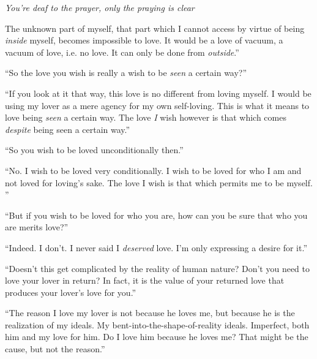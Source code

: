 \documentclass{article}
\begin{document}
\textit{You're deaf to the prayer, only the praying is clear}
\newline\newline

The unknown part of myself, that part which I cannot access by virtue of
being \textit{inside} myself, becomes impossible to love. It would be
a love of vacuum, a vacuum of love, i.e. no love. It can
only be done from \textit{outside}.'' \newline
\newline

``So the love you wish is really a wish to be \textit{seen} a certain
way?'' \newline
\newline

``If you look at it that way, this love is no different from loving
myself. I would be using my lover as a mere agency for my own
self-loving. This is what it means to love being \textit{seen} a certain
way. The love \textit{I} wish however is that which comes
\textit{despite} being seen a certain way.'' \newline
\newline

``So you wish to be loved unconditionally then.'' \newline
\newline

``No. I wish to be loved very conditionally. I wish to be loved for who
I am and not loved for loving's sake. The love I wish is that which
permits me to be myself. ''\newline
\newline

``But if you wish to be loved for who you are, how can you be sure that
who you are merits love?'' \newline
\newline

``Indeed. I don't. I never said I \textit{deserved} love. I'm only
expressing a desire for it.''\newline
\newline

``Doesn't this get complicated by the reality of human nature? Don't you
need to love your lover in return? In fact, it is the value of your
returned love that produces your lover's love for you.''\newline
\newline

``The reason I love my lover is not because he loves me, but because he
is the realization of my ideals. My bent-into-the-shape-of-reality
ideals. Imperfect, both him and my love for him. Do I love him because
he loves me? That might be the cause, but not the reason.'' \newline
\newline
\end{document}
